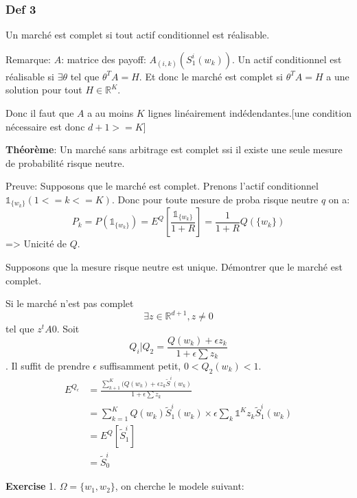\documentclass{article}
\begin{document}
\subsubsection{Def 3}

Un march\'e est complet si tout actif conditionnel est r\'ealisable.


Remarque: 
$A$: matrice des payoff: $A_{(i,k)}(S_1^i(w_k))$. Un actif conditionnel est r\'ealisable si $\exists \theta$ tel que $\theta^T A=H$. Et donc le march\'e est complet si $\theta^T A=H$ a une solution pour tout $H\in \mathbb{R}^K$.	

Donc il faut que $A$ a au moins $K$ lignes lin\'eairement ind\'edendantes.[une condition n\'ecessaire est donc $d+1>=K$]

\textbf{Th\'eor\`eme}: Un march\'e sans arbitrage est complet ssi il existe une seule mesure de probabilit\'e risque neutre.

Preuve: Supposons que le march\'e est complet. Prenons l'actif conditionnel $\mathbb{1}_{\{w_k\}}(1<=k<=K)$. Donc pour toute mesure de proba risque neutre $q$ on a:
\begin{equation}
P_k=P(\mathbb{1}_{\{w_k\}})=E^Q[\frac{\mathbb{1}_{\{w_k\}}}{1+R}]=\frac{1}{1+R}Q(\{w_k\})
\end{equation}
=> Unicit\'e de $Q$.

Supposons que la mesure risque neutre est unique. D\'emontrer que le march\'e est complet.

Si le march\'e n'est pas complet 
\begin{equation}
	\exists z\in\mathbb{R}^{d+1}, z\neq 0
\end{equation}
tel que $z^tA0$. Soit
\begin{equation}
	Q_i|Q_2=\frac{Q(w_k)+\epsilon z_k}{1+\epsilon \sum z_k}
\end{equation}. 
Il suffit de prendre $\epsilon$ suffisamment petit, $0<Q_2(w_k)<1$.
\begin{equation}
	\begin{split}
		E^{Q_\epsilon}&=\frac{\sum_{k+1}^K (Q(w_k)+\epsilon z_k \tilde{S}^i(w_k)}{1+\epsilon \sum z_k}\\
		&=\sum_{k=1}^K Q(w_k) \tilde{S}_1^i(w_k)\times\epsilon \sum_k \mathds{1}^{K} z_k \tilde{S}_1^i (w_k)\\
		&=E^Q[\tilde{S}_1^i]\\ 
		&=\tilde{S}_0^i
	\end{split}
\end{equation}

\textbf{Exercise}
1. $\Omega=\{w_1, w_2\}$, on cherche le modele suivant:
\end{document}
